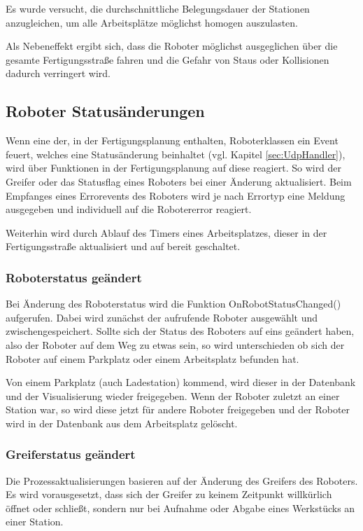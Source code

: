 Es wurde versucht, die durchschnittliche Belegungsdauer der Stationen anzugleichen, um alle Arbeitsplätze möglichst homogen auszulasten. 

Als Nebeneffekt ergibt sich, dass die Roboter möglichst ausgeglichen über die gesamte Fertigungsstraße fahren und die Gefahr von Staus oder Kollisionen dadurch verringert wird. 

\subsection{Roboter Statusänderungen}

Wenn eine der, in der Fertigungsplanung enthalten, Roboterklassen ein Event feuert, welches eine Statusänderung beinhaltet (vgl. Kapitel \ref{sec:UdpHandler}), wird über Funktionen in der Fertigungsplanung auf diese reagiert. So wird der Greifer oder das Statusflag eines Roboters bei einer Änderung aktualisiert. Beim Empfanges eines Errorevents des Roboters wird je nach Errortyp eine Meldung ausgegeben und individuell auf die Robotererror reagiert. 

Weiterhin wird durch Ablauf des Timers eines Arbeitsplatzes, dieser in der Fertigungsstraße aktualisiert und auf bereit geschaltet. 


\subsubsection{Roboterstatus geändert}

Bei Änderung des Roboterstatus wird die Funktion OnRobotStatusChanged() aufgerufen. Dabei wird zunächst der aufrufende Roboter ausgewählt und zwischengespeichert. Sollte sich der Status des Roboters auf eins geändert haben, also der Roboter auf dem Weg zu etwas sein, so wird unterschieden ob sich der Roboter auf einem Parkplatz oder einem Arbeitsplatz befunden hat.

Von einem Parkplatz (auch Ladestation) kommend, wird dieser in der Datenbank und der Visualisierung wieder freigegeben. Wenn der Roboter zuletzt an einer Station war, so wird diese jetzt für andere Roboter freigegeben und der Roboter wird in der Datenbank aus dem Arbeitsplatz gelöscht. 

\subsubsection{Greiferstatus geändert}

Die Prozessaktualisierungen basieren auf der Änderung des Greifers des Roboters. Es wird vorausgesetzt, dass sich der Greifer zu keinem Zeitpunkt willkürlich öffnet oder schließt, sondern nur bei Aufnahme oder Abgabe eines Werkstücks an einer Station. 

